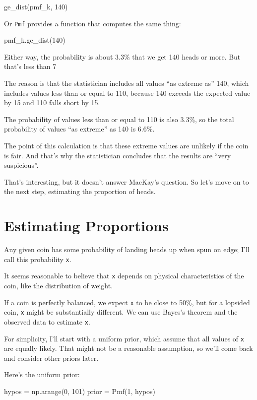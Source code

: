 \documentclass[12pt]{book}
\theoremstyle{exercise}
\newcommand{\py}[1]{{\tt #1}}%
\begin{document}
\begin{code}
ge_dist(pmf_k, 140)
\end{code}

Or \py{Pmf} provides a function that computes the same thing:

\begin{code}
pmf_k.ge_dist(140)
\end{code}

Either way, the probability is about 3.3\% that we get 140 heads or more.
But that's less than 7%

The reason is that the statistician includes all values ``as extreme as'' 140, which includes values less than or equal to 110, because 140 exceeds the expected value by 15 and 110 falls short by 15.

The probability of values less than or equal to 110 is also 3.3\%,
so the total probability of values ``as extreme'' as 140 is 6.6\%.

The point of this calculation is that these extreme values are unlikely if the coin is fair.
And that's why the statistician concludes that the results are ``very suspicious''.

That's interesting, but it doesn't answer MacKay's question.  So let's move on to the next step, estimating the proportion of heads.


\section{Estimating Proportions}
\label{estprop}

Any given coin has some probability of landing heads up when spun
on edge; I'll call this probability \py{x}.

It seems reasonable to believe that \py{x} depends
on physical characteristics of the coin, like the distribution
of weight.

If a coin is perfectly balanced, we expect \py{x} to be close to 50\%, but
for a lopsided coin, \py{x} might be substantially different.  We can use
Bayes's theorem and the observed data to estimate \py{x}.

For simplicity, I'll start with a uniform prior, which assume that all values of \py{x} are equally likely.
That might not be a reasonable assumption, so we'll come back and consider other priors later.

Here's the uniform prior:

\begin{code}
hypos = np.arange(0, 101)
prior = Pmf(1, hypos)
\end{code}
\end{document}
